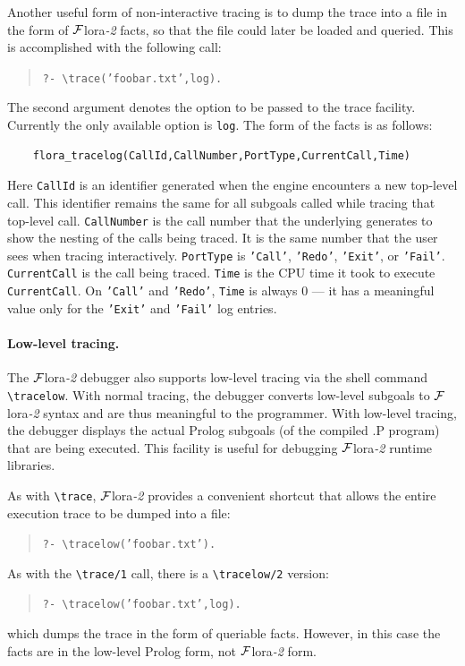 \documentclass[11pt]{article}
\newcommand{\FLORA}{{\mbox{\sc ${\cal F}${lora}\rm\emph{-2}}}\xspace}
\newcommand{\FLSYSTEM}{\FLORA}
\newcommand{\bs}{\textbackslash}
\begin{document}
\index{\bs{}trace/2}
Another useful form of non-interactive
tracing is to dump the trace into a file in the form
of \FLSYSTEM facts, so that the file could later be loaded and queried. This
is accomplished with the following call:
\begin{quote}
  {\tt     ?- \bs{}trace('foobar.txt',log).}
\end{quote}
The second argument denotes the option to be passed to the trace facility.
Currently the only available option is \texttt{log}.
The form of the facts is as follows:
\begin{verbatim}
    flora_tracelog(CallId,CallNumber,PortType,CurrentCall,Time)
\end{verbatim}
Here \texttt{CallId} is an identifier generated when the engine encounters a
new top-level call. This identifier remains the same for all subgoals
called while tracing that top-level call.
\texttt{CallNumber} is the call number that the underlying generates to show the
nesting of the calls being traced. It is the same number that the user sees when
tracing interactively.  \texttt{PortType} is \texttt{'Call'},
\texttt{'Redo'}, \texttt{'Exit'}, or \texttt{'Fail'}.   
\texttt{CurrentCall} is the call being traced.
\texttt{Time} is the CPU time it
took to execute \texttt{CurrentCall}. On \texttt{'Call'} and \texttt{'Redo'},
\texttt{Time} is always 0 --- it has a meaningful value only for the
\texttt{'Exit'} and \texttt{'Fail'} log entries.

\index{\bs{}tracelow}
\paragraph{Low-level tracing.}
The \FLSYSTEM debugger also supports low-level tracing via the shell command {\tt
  \bs{}tracelow}. With normal tracing, the debugger converts low-level
subgoals to \FLSYSTEM syntax and are thus
meaningful to the programmer. With low-level tracing, the debugger displays
the actual Prolog subgoals (of the compiled .P program) that are being
executed. This facility is useful for debugging \FLSYSTEM runtime libraries.

As with {\tt \bs{}trace}, \FLSYSTEM provides a convenient shortcut that allows
the entire execution trace to be dumped into a file:
\begin{quote}
 \tt     ?- \bs{}tracelow('foobar.txt').  
\end{quote}

As with the \texttt{\bs{}trace/1} call, there is a \texttt{\bs{}tracelow/2}   
version:
\begin{quote}
 \tt     ?- \bs{}tracelow('foobar.txt',log).  
\end{quote}
which dumps the trace in the form of queriable facts. However, in this case
the facts are in the low-level Prolog form, not \FLSYSTEM form.
\end{document}
